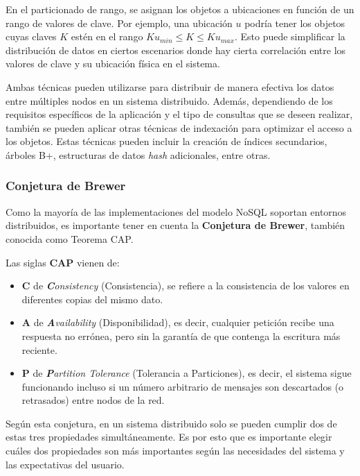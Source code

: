 \documentclass[pdflatex,sn-mathphys-num]{sn-jnl}
\theoremstyle{thmstyleone}%
\theoremstyle{thmstyletwo}%
\theoremstyle{thmstylethree}%
\begin{document}
En el particionado de rango, se asignan los objetos a ubicaciones en función de un rango de valores de clave. Por ejemplo, una ubicación $u$ podría tener los objetos cuyas claves $K$ estén en el rango $Ku_{min} \leq K \leq Ku_{max}$. Esto puede simplificar la distribución de datos en ciertos escenarios donde hay cierta correlación entre los valores de clave y su ubicación física en el sistema.

Ambas técnicas pueden utilizarse para distribuir de manera efectiva los datos entre múltiples nodos en un sistema distribuido. Además, dependiendo de los requisitos específicos de la aplicación y el tipo de consultas que se deseen realizar, también se pueden aplicar otras técnicas de indexación para optimizar el acceso a los objetos. Estas técnicas pueden incluir la creación de índices secundarios, árboles B+, estructuras de datos \textit{hash} adicionales, entre otras.

\subsubsection{Conjetura de Brewer}\label{sec324}

Como la mayoría de las implementaciones del modelo NoSQL soportan entornos distribuidos, es importante tener en cuenta la \textbf{Conjetura de Brewer}, también conocida como Teorema CAP. 

Las siglas \textbf{CAP} vienen de:

\begin{itemize}
    \item \textbf{C} de \textit{\textbf{C}onsistency} (Consistencia), se refiere a la consistencia de los valores en diferentes copias del mismo dato. 
    
    \item \textbf{A} de \textit{\textbf{A}vailability} (Disponibilidad), es decir, cualquier petición recibe una respuesta no errónea, pero sin la garantía de que contenga la escritura más reciente.

    \item \textbf{P} de \textit{\textbf{P}artition Tolerance} (Tolerancia a Particiones), es decir, el sistema sigue funcionando incluso si un número arbitrario de mensajes son descartados (o retrasados) entre nodos de la red.
\end{itemize}

Según esta conjetura, en un sistema distribuido solo se pueden cumplir dos de estas tres propiedades simultáneamente. Es por esto que es importante elegir cuáles dos propiedades son más importantes según las necesidades del sistema y las expectativas del usuario.
\end{document}
